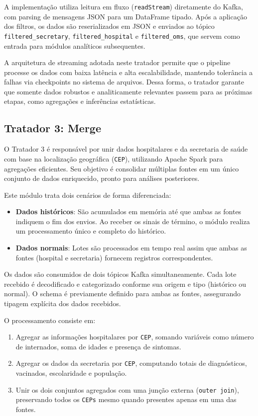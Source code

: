 \documentclass[a4paper,12pt]{article}
\begin{document}
A implementação utiliza leitura em fluxo (\texttt{readStream}) diretamente do Kafka, com parsing de mensagens JSON para um DataFrame tipado. Após a aplicação dos filtros, os dados são reserializados em JSON e enviados ao tópico \texttt{filtered\_secretary}, \texttt{filtered\_hospital} e \texttt{filtered\_oms}, que servem como entrada para módulos analíticos subsequentes.

A arquitetura de streaming adotada neste tratador permite que o pipeline processe os dados com baixa latência e alta escalabilidade, mantendo tolerância a falhas via checkpoints no sistema de arquivos. Dessa forma, o tratador garante que somente dados robustos e analiticamente relevantes passem para as próximas etapas, como agregações e inferências estatísticas.


\subsection{Tratador 3: Merge}

O Tratador 3 é responsável por unir dados hospitalares e da secretaria de saúde com base na localização geográfica (\texttt{CEP}), utilizando Apache Spark para agregações eficientes. Seu objetivo é consolidar múltiplas fontes em um único conjunto de dados enriquecido, pronto para análises posteriores.

Este módulo trata dois cenários de forma diferenciada:

\begin{itemize}
    \item \textbf{Dados históricos}: São acumulados em memória até que ambas as fontes indiquem o fim dos envios. Ao receber os sinais de término, o módulo realiza um processamento único e completo do histórico.
    \item \textbf{Dados normais}: Lotes são processados em tempo real assim que ambas as fontes (hospital e secretaria) fornecem registros correspondentes.
\end{itemize}

Os dados são consumidos de dois tópicos Kafka simultaneamente. Cada lote recebido é decodificado e categorizado conforme sua origem e tipo (histórico ou normal). O schema é previamente definido para ambas as fontes, assegurando tipagem explícita dos dados recebidos.

O processamento consiste em:
\begin{enumerate}
    \item Agregar as informações hospitalares por \texttt{CEP}, somando variáveis como número de internados, soma de idades e presença de sintomas.
    \item Agregar os dados da secretaria por \texttt{CEP}, computando totais de diagnósticos, vacinados, escolaridade e população.
    \item Unir os dois conjuntos agregados com uma junção externa (\texttt{outer join}), preservando todos os \texttt{CEPs} mesmo quando presentes apenas em uma das fontes.
\end{enumerate}
\end{document}

